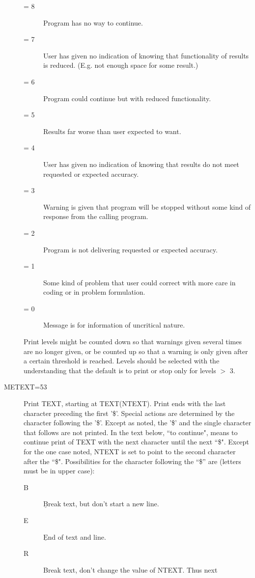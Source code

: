 \documentclass[twoside]{MATH77}
\begin{document}
\begin{description}
\begin{description}
\item[= 8]  Program has no way to continue.
\item[= 7]  User has given no indication of knowing that functionality of
       results is reduced.  (E.g. not enough space for some result.)
\item[= 6]  Program could continue but with reduced functionality.
\item[= 5]  Results far worse than user expected to want.
\item[= 4]  User has given no indication of knowing that results do not
       meet requested or expected accuracy.
\item[= 3]  Warning is given that program will be stopped without some
       kind of response from the calling program.
\item[= 2]  Program is not delivering requested or expected accuracy.
\item[= 1]  Some kind of problem that user could correct with more care in
       coding or in problem formulation.
\item[= 0]  Message is for information of uncritical nature.
\end{description}
           Print levels might be counted down so that warnings given
           several times are no longer given, or be counted up so
           that a warning is only given after a certain threshold is
           reached.  Levels should be selected with the understanding
           that the default is to print or stop only for levels $>$ 3.
\item[METEXT=53]  Print TEXT, starting at TEXT(NTEXT).  Print ends
           with the last character preceding the first '\$'.  Special
           actions are determined by the character following the '\$'.
           Except as noted, the '\$' and the single character that
           follows are not printed.  In the text below, ``to continue",
           means to continue print of TEXT with the next character
           until the next ``\$".  Except for the one case noted, NTEXT
           is set to point to the second character after the ``\$".
           Possibilities for the character following the ``\$'' are
           (letters must be in upper case):
\begin{description}
\item[B] $\underline{\text{B}}$reak text, but don't start a new line.
\item[E] $\underline{\text{E}}$nd of text and line.
\item[R] Break text, don't change the value of NTEXT.  Thus next

\end{description}
\end{description}
\end{document}

